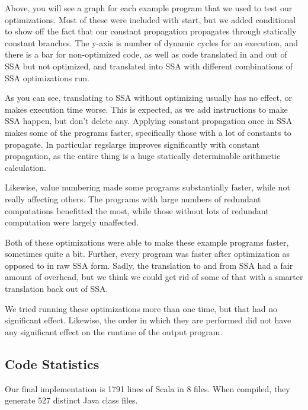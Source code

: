 \documentclass[12pt,letterpaper]{article}
\begin{document}
Above, you will see a graph for each example program that we used to
test our optimizations. Most of these were included with start, but we
added conditional to show off the fact that our constant propagation
propagates through statically constant branches. The y-axis is number
of dynamic cycles for an execution, and there is a bar for
non-optimized code, as well as code translated in and out of SSA but
not optimized, and translated into SSA with different combinations of
SSA optimizations run.

As you can see, translating to SSA without optimizing usually has no
effect, or makes execution time worse. This is expected, as we add
instructions to make SSA happen, but don't delete any. Applying
constant propagation once in SSA makes some of the programs faster,
specifically those with a lot of constants to propagate. In particular
regslarge improves significantly with constant propagation, as the
entire thing is a huge statically determinable arithmetic calculation.

Likewise, value numbering made some programs substantially faster,
while not really affecting others. The programs with large numbers of
redundant computations benefitted the most, while those without lots
of redundant computation were largely unaffected.

Both of these optimizations were able to make these example programs
faster, sometimes quite a bit. Further, every program was faster after
optimization as opposed to in raw SSA form. Sadly, the translation to
and from SSA had a fair amount of overhead, but we think we could get
rid of some of that with a smarter translation back out of SSA.

We tried running these optimizations more than one time, but that had
no significant effect. Likewise, the order in which they are performed
did not have any significant effect on the runtime of the output
program.

\subsection*{Code Statistics}

Our final implementation is 1791 lines of Scala in 8 files. When
compiled, they generate 527 distinct Java class files. 
\end{document}
